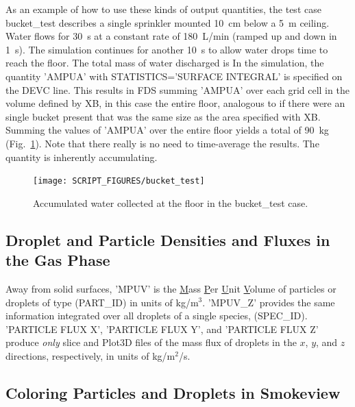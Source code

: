 \documentclass[11pt]{book}
\begin{document}
As an example of how to use these kinds of output quantities, the test case {\ct bucket\_test} describes a single sprinkler mounted 10~cm below a 5~m ceiling. Water flows for 30~s at a constant rate of 180~L/min (ramped up and down in 1~s).  The simulation continues for another 10~s to allow water drops time to reach the floor. The total mass of water discharged is
\be
\ee
In the simulation, the quantity {\ct 'AMPUA'} with {\ct STATISTICS='SURFACE INTEGRAL'} is specified on the {\ct DEVC} line.  This results in FDS summing {\ct 'AMPUA'} over each grid cell in the volume defined by {\ct XB}, in this case the entire floor, analogous to if there were an single bucket present that was the same size as the area specified with {\ct XB}. Summing the values of {\ct 'AMPUA'} over the entire floor yields a total of 90~kg (Fig.~\ref{bucket_test_fig}). Note that there really is no need to time-average the results. The quantity is inherently accumulating.

\begin{figure}[ht]
\centering
\texttt{[image: SCRIPT\_FIGURES/bucket\_test]}
\caption[Results of the {\ct bucket\_test} case]{Accumulated water collected at the floor in the {\ct bucket\_test} case.}
\label{bucket_test_fig}
\end{figure}


\subsection{Droplet and Particle Densities and Fluxes in the Gas Phase}

Away from solid surfaces, {\ct 'MPUV'} is the \underline{M}ass \underline{P}er \underline{U}nit \underline{V}olume of particles or droplets of type ({\ct PART\_ID}) in units of kg/m$^3$.  {\ct 'MPUV\_Z'} provides the same information integrated over all droplets of a single species, ({\ct SPEC\_ID}).  {\ct 'PARTICLE FLUX X'},  {\ct 'PARTICLE FLUX Y'}, and {\ct 'PARTICLE FLUX Z'} produce {\em only} slice and Plot3D files
of the mass flux of droplets in the $x$, $y$, and $z$ directions, respectively, in units of kg/m$^2$/s.


\subsection{Coloring Particles and Droplets in Smokeview}
\end{document}
